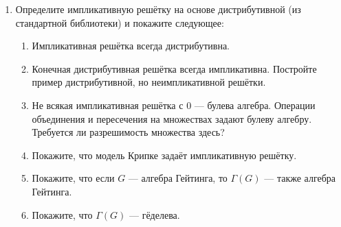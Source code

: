 \documentclass[10pt,a4paper,oneside]{article}
\begin{document}
\begin{enumerate}
\item Определите импликативную решётку на основе дистрибутивной (из стандартной библиотеки) и покажите следующее:
\begin{enumerate}
\item Импликативная решётка всегда дистрибутивна.
\item Конечная дистрибутивная решётка всегда импликативна. Постройте пример дистрибутивной, но неимпликативной решётки.
\item Не всякая импликативная решётка с 0 --- булева алгебра. Операции объединения и пересечения на множествах задают булеву алгебру.
Требуется ли разрешимость множества здесь?
\item Покажите, что модель Крипке задаёт импликативную решётку.
\item Покажите, что если $G$ --- алгебра Гейтинга, то $\Gamma(G)$ --- также алгебра Гейтинга.
\item Покажите, что $\Gamma(G)$ --- гёделева.
\end{enumerate}
\end{enumerate}
\end{document}
